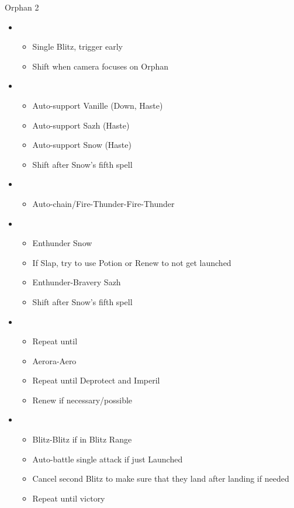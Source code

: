 \begin{battle}{Orphan 2}
\begin{multicols}{2}
\begin{itemize}
    \item \second
    \begin{itemize}
        \item Single Blitz, trigger early
	\item Shift when camera focuses on Orphan
    \end{itemize}
    \item \fourth
    \begin{itemize}
        \item Auto-support Vanille (Down, Haste)
        \item Auto-support Sazh (Haste)
        \item Auto-support Snow (Haste)
	\item Shift after Snow's fifth spell
    \end{itemize}
    \item \sixth
    \begin{itemize}
        \item Auto-chain/Fire-Thunder-Fire-Thunder
    \end{itemize}
    \item \fourth
    \begin{itemize}
        \item Enthunder Snow
        \item If Slap, try to use Potion or Renew to not get launched
        \item Enthunder-Bravery Sazh
        \item Shift after Snow's fifth spell
    \end{itemize}
    \columnbreak
    \item \fifth
    \begin{itemize}
        \item Repeat until \stagger
        \item Aerora-Aero
        \item Repeat until Deprotect and Imperil
	\item Renew if necessary/possible
    \end{itemize}
    \item \first
    \begin{itemize}
        \item Blitz-Blitz if in Blitz Range
        \item Auto-battle single attack if just Launched
        \item Cancel second Blitz to make sure that they land after landing if needed
        \item Repeat until victory
    \end{itemize}
\end{itemize}
\end{multicols}
\end{battle}
